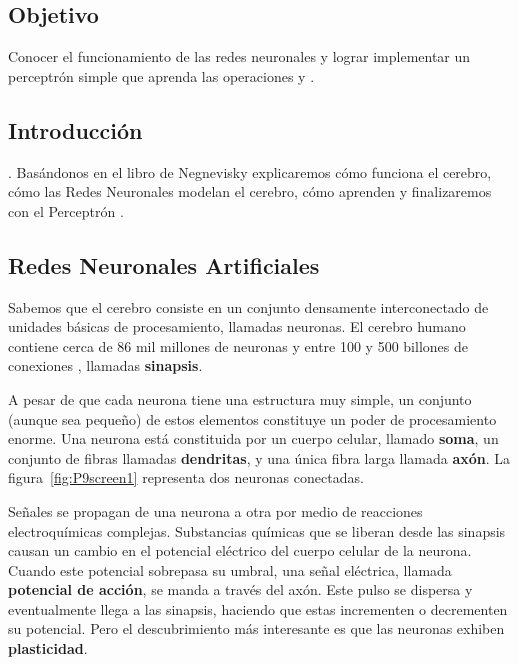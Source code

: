 


\subsection{Objetivo}
Conocer el funcionamiento de las redes neuronales y lograr implementar un perceptrón simple que aprenda las operaciones  y .

\subsection{Introducci\'on}

 \parencite[166]{Nengnevitsky2005}. Basándonos en el libro de Negnevisky explicaremos cómo funciona el cerebro, cómo las Redes Neuronales modelan el cerebro, cómo aprenden y finalizaremos con el Perceptrón \parencite[cap. 6]{Nengnevitsky2005}.


\subsection{Redes Neuronales Artificiales}

Sabemos que el cerebro consiste en un conjunto densamente interconectado de unidades básicas de procesamiento, llamadas neuronas. El cerebro humano contiene cerca de 86 mil millones de neuronas \parencite{Herculano-Houzel2009} y entre 100 y 500 billones de conexiones \parencite{Drachman2005}, llamadas \textbf{sinapsis}.\par

A pesar de que cada neurona tiene una estructura muy simple, un conjunto (aunque sea pequeño) de estos elementos constituye un poder de procesamiento enorme. Una neurona está constituida por un cuerpo celular, llamado \textbf{soma}, un conjunto de fibras llamadas \textbf{dendritas}, y una única fibra larga llamada \textbf{axón}. La figura~\ref{fig:P9screen1} representa dos neuronas conectadas.

Señales se propagan de una neurona a otra por medio de reacciones electroquímicas complejas. Substancias químicas que se liberan desde las sinapsis causan un cambio en el potencial eléctrico del cuerpo celular de la neurona. Cuando este potencial sobrepasa su umbral, una señal eléctrica, llamada \textbf{potencial de acción}, se manda a través del axón. Este pulso se dispersa y eventualmente llega a las sinapsis, haciendo que estas incrementen o decrementen su potencial. Pero el descubrimiento más interesante es que las neuronas exhiben \textbf{plasticidad}.\par

